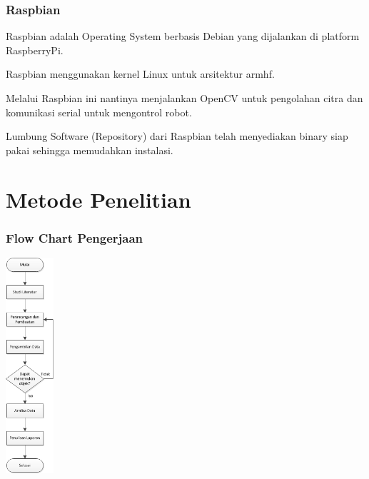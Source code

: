 \documentclass[table,dvipsnames]{beamer}
\begin{document}
\begin{frame}
\frametitle{Raspbian}
\begin{block}{}
Raspbian adalah Operating System berbasis Debian yang dijalankan di platform RaspberryPi.
\end{block}
\begin{block}{}
Raspbian menggunakan kernel Linux untuk arsitektur armhf.
\end{block}
\begin{block}{}
Melalui Raspbian ini nantinya menjalankan OpenCV untuk pengolahan citra dan komunikasi serial untuk mengontrol robot.
\end{block}
\begin{block}{}
Lumbung Software (Repository) dari Raspbian telah menyediakan binary siap pakai sehingga memudahkan instalasi.
\end{block}
\end{frame}


\section{Metode Penelitian}

\begin{frame}
\frametitle{Flow Chart Pengerjaan}
\begin{center}
 \includegraphics[width=50pt]{./met_pen/flow}
\end{center}
\end{frame}
\end{document}
